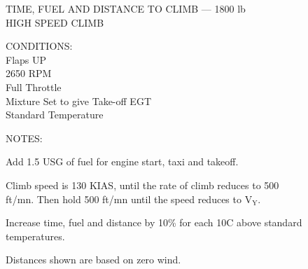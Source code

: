 \begin{figure}[t]
\begin{center}
\begin{perfhdr}TIME, FUEL AND DISTANCE TO CLIMB --- 1800 lb\\
HIGH SPEED CLIMB\\
\end{perfhdr}
\Large

\normalsize
\vspace{5ex}
    \raggedright 
    CONDITIONS:\\
    Flaps UP\\
    2650 RPM\\
    Full Throttle\\
    Mixture Set to give Take-off EGT\\
    Standard Temperature\\
\hfill

\vspace{\perfnoteskip}
    \raggedright NOTES:
    \begin{enumerate*}
      \item Add 1.5 USG of fuel for engine start, taxi and takeoff.
      \item Climb speed is 130 KIAS, until the rate of climb reduces to 500 ft/mn.  Then hold 500 ft/mn until the speed reduces to $\mathrm{V_{Y}}$.
      \item Increase time, fuel and distance by 10\% for each 10\textdegree C above standard temperatures.
      \item Distances shown are based on zero wind.
      \end{enumerate*}
\vspace{\perfnoteskip}
\settowidth{\colOne}{WEIGHT}
\settowidth{\colTwo}{PRESSURE}
\settowidth{\colThree}{TEMP}
\settowidth{\colFour}{CLIMB}
\settowidth{\colFive}{RATE OF}
\settowidth{\colSix}{TIME}
\settowidth{\colSeven}{USED}
\settowidth{\colEight}{DIST.}


\end{center}
\end{figure}
